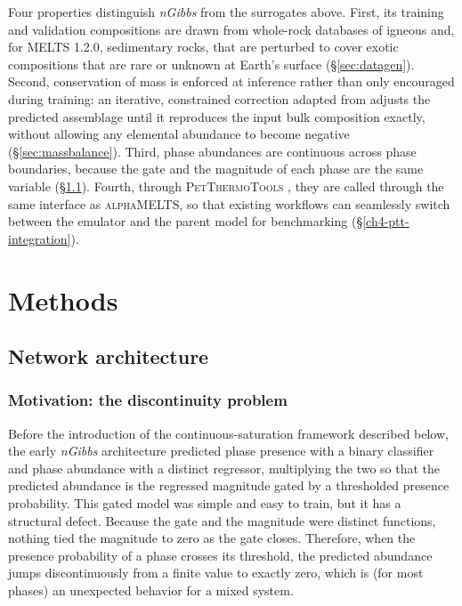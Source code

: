 Four properties distinguish \emph{nGibbs} from the surrogates above. First, its training and validation compositions are drawn from whole-rock
databases of igneous and, for \textsc{MELTS} 1.2.0, sedimentary rocks, that are
perturbed to cover exotic compositions that are rare or unknown at Earth's surface (\S\ref{sec:datagen}). Second, conservation of mass is enforced at
inference rather than only encouraged during training: an iterative, constrained correction adapted from \citet{asimow1998} adjusts
the predicted assemblage until it reproduces the input bulk composition exactly, without allowing any elemental abundance to become
negative (\S\ref{sec:massbalance}). Third, phase abundances are continuous across phase boundaries, because the gate and the magnitude of each phase are the same variable
(\S\ref{sec:continuous}). Fourth, through \textsc{PetThermoTools} \citep{gleeson2025}, they are called through the same interface as
\textsc{alphaMELTS}, so that existing workflows can seamlessly switch between the emulator and the parent model for benchmarking
(\S\ref{ch4-ptt-integration}).

\section{Methods}\label{ch4-methods}

\subsection{Network architecture}
\label{sec:continuous}

\subsubsection{Motivation: the discontinuity problem}
\label{sec:continuous-motivation}

Before the introduction of the continuous-saturation framework described below, the early \emph{nGibbs} architecture predicted phase presence with a binary classifier
and phase abundance with a distinct regressor, multiplying the two so that the predicted
abundance is the regressed magnitude gated by a thresholded presence probability. 
This gated model was simple and easy to train, but it has a structural defect.
Because the gate and the magnitude were distinct functions,
nothing tied the magnitude to zero as the gate closes. Therefore, when the presence probability of a phase
crosses its threshold, the predicted abundance jumps discontinuously from a finite
value to exactly zero, which is (for most phases) an unexpected behavior for a mixed system.

